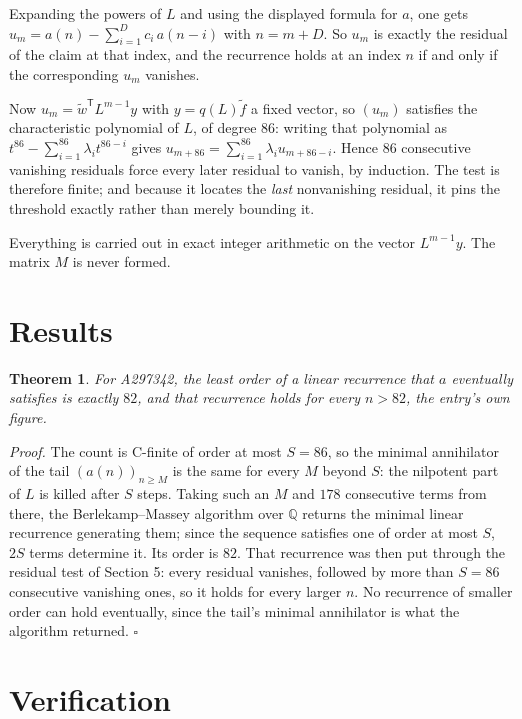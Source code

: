 \documentclass[11pt]{article}
\newtheorem{theorem}{Theorem}
\theoremstyle{definition}
\begin{document}
Expanding the powers of $L$ and using the displayed formula for $a$, one gets $u_m = a(n) - \sum_{i=1}^{D} c_i\,a(n-i)$ with $n = m + D$. So $u_m$ is exactly the residual of the claim at that index, and the recurrence holds at an index $n$ if and only if the corresponding $u_m$ vanishes.

Now $u_m = \tilde w^{\mathsf T} L^{m-1} y$ with $y = q(L)\tilde f$ a fixed vector, so $(u_m)$ satisfies the characteristic polynomial of $L$, of degree $86$: writing that polynomial as $t^{86} - \sum_{i=1}^{86} \lambda_i t^{86-i}$ gives $u_{m+86} = \sum_{i=1}^{86} \lambda_i u_{m+86-i}$. Hence $86$ consecutive vanishing residuals force every later residual to vanish, by induction. The test is therefore finite; and because it locates the {\itshape last} nonvanishing residual, it pins the threshold exactly rather than merely bounding it.

Everything is carried out in exact integer arithmetic on the vector $L^{m-1}y$. The matrix $M$ is never formed.

\section{Results}

\begin{theorem} For A297342, the least order of a linear recurrence that $a$ eventually satisfies is exactly $82$, and that recurrence holds for every $n > 82$, the entry's own figure.\end{theorem}

{\itshape Proof.} The count is C-finite of order at most $S = 86$, so the minimal annihilator of the tail $(a(n))_{n \ge M}$ is the same for every $M$ beyond $S$: the nilpotent part of $L$ is killed after $S$ steps. Taking such an $M$ and $178$ consecutive terms from there, the Berlekamp--Massey algorithm over $\mathbb{Q}$ returns the minimal linear recurrence generating them; since the sequence satisfies one of order at most $S$, $2S$ terms determine it. Its order is $82$. That recurrence was then put through the residual test of Section 5: every residual vanishes, followed by more than $S = 86$ consecutive vanishing ones, so it holds for every larger $n$. No recurrence of smaller order can hold eventually, since the tail's minimal annihilator is what the algorithm returned. $\square$

\section{Verification}
\end{document}
